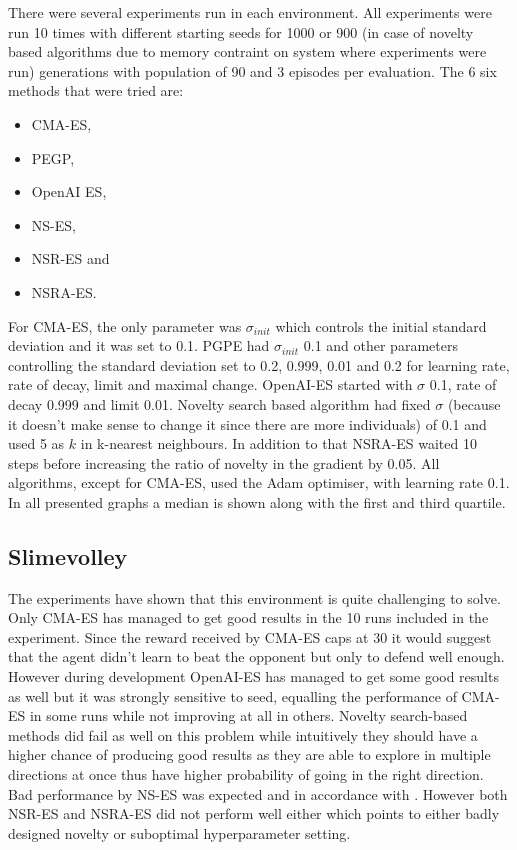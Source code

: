There were several experiments run in each environment. All experiments were run 10 times with different starting seeds for 1000 or 900 (in case of novelty based algorithms due to memory contraint on system where experiments were run) generations with population of 90 and 3 episodes per evaluation. The 6 six methods that were tried are:
\begin{itemize}
    \item CMA-ES, 
    \item PEGP,
    \item OpenAI ES,
    \item NS-ES, 
    \item NSR-ES and
    \item NSRA-ES.
\end{itemize}

For CMA-ES, the only parameter was $\sigma_{init}$ which controls the initial standard deviation and it was set to 0.1. PGPE had $\sigma_{init}$ 0.1 and other parameters controlling the standard deviation set to 0.2, 0.999, 0.01 and 0.2 for learning rate, rate of decay, limit and maximal change. OpenAI-ES started with $\sigma$ 0.1, rate of decay 0.999 and limit 0.01. Novelty search based algorithm had fixed $\sigma$ (because it doesn't make sense to change it since there are more individuals) of 0.1 and used 5 as $k$ in k-nearest neighbours. In addition to that NSRA-ES waited 10 steps before increasing the ratio of novelty in the gradient by 0.05. All algorithms, except for CMA-ES, used the Adam \cite{kingma2017adam} optimiser, with learning rate 0.1. In all presented graphs a median is shown along with the first and third quartile.

\subsection{Slimevolley}

The experiments have shown that this environment is quite challenging to solve. Only CMA-ES has managed to get good results in the 10 runs included in the experiment. Since the reward received by CMA-ES caps at 30 it would suggest that the agent didn't learn to beat the opponent but only to defend well enough. However during development OpenAI-ES has managed to get some good results as well but it was strongly sensitive to seed, equalling the performance of CMA-ES in some runs while not improving at all in others. Novelty search-based methods did fail as well on this problem while intuitively they should have a higher chance of producing good results as they are able to explore in multiple directions at once thus have higher probability of going in the right direction. Bad performance by NS-ES was expected and in accordance with \cite{conti2018}. However both NSR-ES and NSRA-ES did not perform well either which points to either badly designed novelty or suboptimal hyperparameter setting. 

